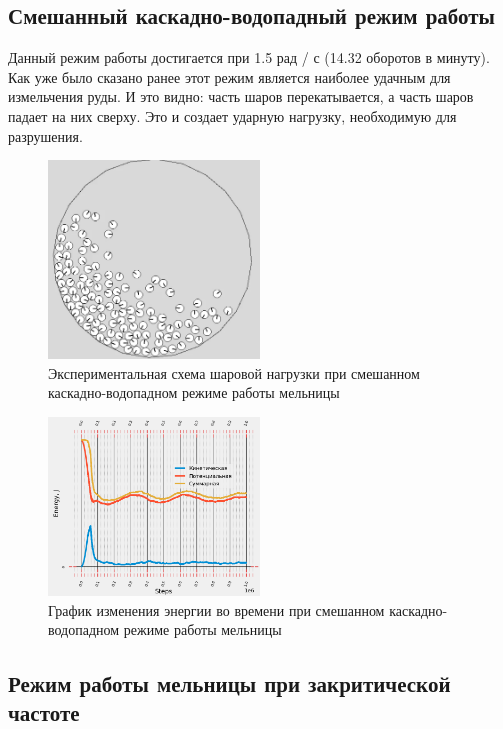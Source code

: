 \documentclass[utf8x, 14pt, oneside, a4paper]{article}
\begin{document}
\subsection{Смешанный каскадно-водопадный режим работы}

Данный режим работы достигается при 1.5 рад / с (14.32 оборотов в минуту).
Как уже было сказано ранее этот режим является наиболее удачным для измельчения руды.
И это видно: часть шаров перекатывается, а часть шаров падает на них сверху.
Это и создает ударную нагрузку, необходимую для разрушения.

\begin{figure}[H]
	\centering
	\includegraphics[width=0.5\textwidth]{smeshan_result} 
	\caption{Экспериментальная схема шаровой нагрузки при смешанном каскадно-водопадном режиме работы мельницы}
	\label{pic:smeshan_result}
\end{figure} 

\begin{figure}[H]
	\centering
	\includegraphics[width=0.5\textwidth]{smeshan_energy} 
	\caption{График изменения энергии во времени при смешанном каскадно-водопадном режиме работы мельницы}
	\label{pic:smeshan_energy}
\end{figure} 

\subsection{Режим работы мельницы при закритической частоте}
\end{document}
